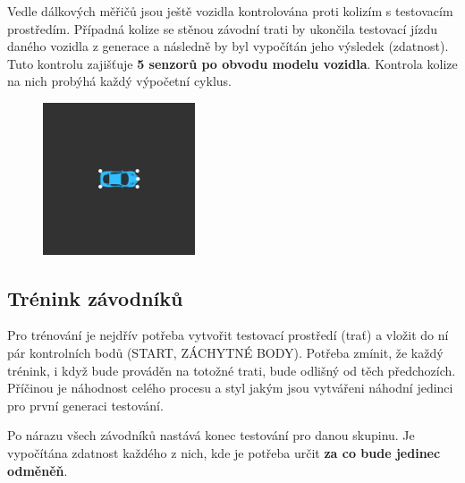 \documentclass[a4paper,12pt]{article}
\newcommand{\tab}
{
    \hspace*{1em}
}
\begin{document}
            \tab Vedle dálkových měřičů jsou ještě vozidla kontrolována proti kolizím s testovacím 
            prostředím. Případná kolize se stěnou závodní trati by ukončila testovací jízdu
            daného vozidla z generace a následně by byl vypočítán jeho výsledek (zdatnost).
            Tuto kontrolu zajišťuje \textbf{5 senzorů po obvodu modelu vozidla}. Kontrola
            kolize na nich probýhá každý výpočetní cyklus.
            \begin{figure}[H]
                \centering
                \includegraphics[trim = 7cm 7cm 7cm 7cm, clip, width=0.4\textwidth]{data/collisionpoints.png}
                \label{fig:collisionpoints}
            \end{figure}

        \vspace*{-3em}
        \subsection{Trénink závodníků}
            Pro trénování je nejdřív potřeba vytvořit testovací prostředí (trať) a vložit
            do ní pár kontrolních bodů (START, ZÁCHYTNÉ BODY). Potřeba zmínit,
            že každý trénink, i když bude prováděn na totožné trati, bude odlišný od těch
            předchozích. Příčinou je náhodnost celého procesu a styl jakým jsou vytvářeni
            náhodní jedinci pro první generaci testování.

            \tab Po nárazu všech závodníků nastává konec testování pro danou skupinu.
            Je vypočítána zdatnost každého z nich, kde je potřeba určit \textbf{za co bude jedinec
            odměněň}. 
            
\end{document}
